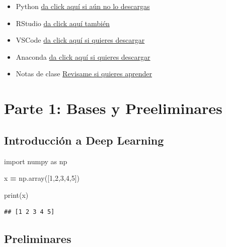 \documentclass[
]{book}
\newenvironment{Shaded}{\begin{snugshade}}{\end{snugshade}}
\newcommand{\BuiltInTok}[1]{#1}
\newcommand{\DecValTok}[1]{\textcolor[rgb]{0.00,0.00,0.81}{#1}}
\newcommand{\ImportTok}[1]{#1}
\newcommand{\NormalTok}[1]{#1}
\newcommand{\OperatorTok}[1]{\textcolor[rgb]{0.81,0.36,0.00}{\textbf{#1}}}
\providecommand{\tightlist}{%
  \setlength{\itemsep}{0pt}\setlength{\parskip}{0pt}}
\begin{document}
\begin{itemize}
\tightlist
\item
  Python \href{https://www.python.org/downloads/}{da click aquí si aún no lo descargas}
\item
  RStudio \href{https://www.rstudio.com/products/rstudio/download/}{da click aquí también}
\item
  VSCode \href{https://code.visualstudio.com/download}{da click aquí si quieres descargar}
\item
  Anaconda \href{https://www.anaconda.com/download}{da click aquí si quieres descargar}
\item
  Notas de clase \href{}{Revisame si quieres aprender}
\end{itemize}

\hypertarget{part-parte-1-bases-y-preeliminares}{%
\part*{Parte 1: Bases y Preeliminares}\label{part-parte-1-bases-y-preeliminares}}

\hypertarget{introducciuxf3n-a-deep-learning}{%
\chapter{Introducción a Deep Learning}\label{introducciuxf3n-a-deep-learning}}

\begin{Shaded}
\begin{Highlighting}[]
\ImportTok{import}\NormalTok{ numpy }\ImportTok{as}\NormalTok{ np}

\NormalTok{x }\OperatorTok{=}\NormalTok{ np.array([}\DecValTok{1}\NormalTok{,}\DecValTok{2}\NormalTok{,}\DecValTok{3}\NormalTok{,}\DecValTok{4}\NormalTok{,}\DecValTok{5}\NormalTok{])}

\BuiltInTok{print}\NormalTok{(x)}
\end{Highlighting}
\end{Shaded}

\begin{verbatim}
## [1 2 3 4 5]
\end{verbatim}

\hypertarget{preliminares}{%
\chapter{Preliminares}\label{preliminares}}
\end{document}
